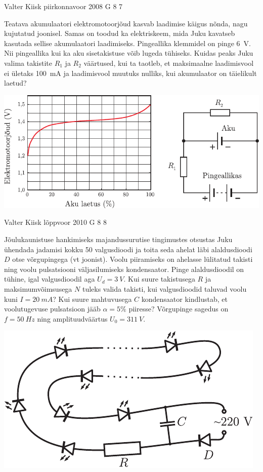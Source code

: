 \documentclass[11pt]{article}
\begin{document}
{%
{Valter Kiisk} %
{piirkonnavoor} %
{2008} %
{G 8} %
{7} %
{
\ifStatement
Teatava akumulaatori elektromotoorjõud kasvab laadimise käigus nõnda, nagu kujutatud joonisel. Samas on toodud ka elektriskeem, mida Juku kavatseb kasutada sellise akumulaatori laadimiseks. Pingeallika klemmidel on pinge \SI{6}{V}. Nii pingeallika kui ka aku sisetakistuse võib lugeda tühiseks. Kuidas peaks Juku valima takistite $R_1$ ja $R_2$ väärtused, kui ta taotleb, et maksimaalne laadimisvool ei ületaks \SI{100}{mA} ja laadimisvool muutuks nulliks, kui akumulaator on täielikult laetud? 

\begin{center}
	\includegraphics[width=\linewidth]{2008-v2g-08-yl}
\end{center}
\fi
}

{Valter Kiisk} %
{lõppvoor} %
{2010} %
{G 8} %
{8} %
{
\ifStatement
Jõulukaunistuse hankimiseks majandussurutise tingimustes otsustas Juku
ühendada jadamisi kokku 50 valgusdioodi ja toita seda ahelat läbi alaldusdioodi $D$ otse
võrgupingega (vt joonist). Voolu piiramiseks on ahelasse lülitatud takisti
ning voolu pulsatsiooni väljasilumiseks kondensaator. Pinge alaldusdioodil on
tühine, igal valgusdioodil aga $U_d=\SI{3}{V}$. Kui suure takistusega $R$ ja maksimumvõimsusega $N$ tuleks valida
takisti, kui valgusdioodid taluvad voolu kuni $I=\SI{20}{mA}$? Kui suure mahtuvusega $C$
kondensaator kindlustab, et voolutugevuse pulsatsioon jääb $\alpha=\num{5}\%$ piiresse? Võrgupinge
sagedus on $f=\SI{50}{Hz}$ ning amplituudväärtus $U_0=\SI{311}{V}$.

\begin{center}
	\includegraphics[scale=0.75]{2010-v3g-08-elektrikuunlad2}
\end{center}
\fi
}

}
\end{document}
